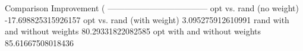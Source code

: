 Comparison	Improvement (%
------------------------------------
opt vs. rand (no weight)	-17.698825315926157
opt vs. rand (with weight)	3.095275912610991
rand with and without weights	80.29331822082585
opt with and without weights	85.61667508018436

